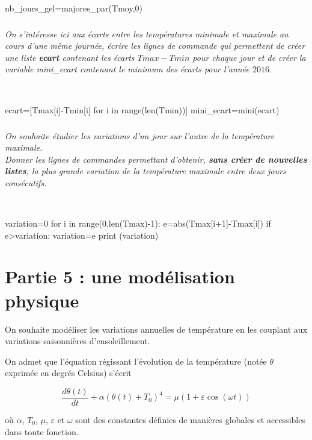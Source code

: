 \documentclass[10pt,fleqn]{article} %
\begin{document}
\ifprof
\begin{corrige}~\
\begin{python}
nb_jours_gel=majores_par(Tmoy,0)
\end{python}
\end{corrige}
\else
\fi

\subparagraph{} 
\textit{On s'intéresse ici aux écarts entre les températures minimale et maximale au cours d'une même
 journée, écrire les lignes de commande qui permettent de créer une liste \textbf{ecart} 
 contenant les écarts $Tmax-Tmin$ pour chaque jour et de créer la variable mini\_ecart contenant 
 le minimum des écarts pour l'année $2016$.}

\ifprof
\begin{corrige}~\
\begin{python}
ecart=[Tmax[i]-Tmin[i] for i in range(len(Tmin))]
mini_ecart=mini(ecart)
\end{python}
\end{corrige}
\else
\fi
 
 \subparagraph{} 
\textit{On souhaite étudier les variations d'un jour sur l'autre de la température maximale.\\
 Donner les lignes de commandes permettant d'obtenir, \textbf{sans créer de nouvelles listes}, 
 la plus grande variation de la température maximale entre deux jours consécutifs.}

\ifprof
\begin{corrige}~\
\begin{python}
variation=0
for i in range(0,len(Tmax)-1):
    e=abs(Tmax[i+1]-Tmax[i])
    if e>variation:
        variation=e
print (variation)
\end{python}
\end{corrige}
\else
\fi
 

\section*{Partie 5 : une modélisation physique}

On souhaite modéliser les variations annuelles de 
température en les couplant aux variations saisonnières d'ensoleillement.

On admet que l'équation régissant l'évolution de la température (notée $\theta$ exprimée
en degrés Celsius) s'écrit

$$	\frac{d\theta(t)}{dt} + \alpha\left( \theta(t)+T_0\right)^4 = \mu\left(1 + \varepsilon
\cos(\omega t)\right)	$$

où $\alpha$, $T_0$, $\mu$, $\varepsilon$ et $\omega$ sont des constantes définies de manières 
globales et accessibles dans toute fonction.\\
\end{document}
